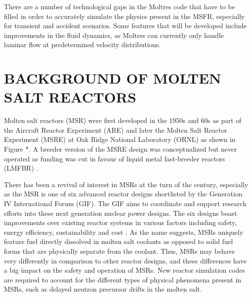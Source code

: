 \documentclass[letterpaper]{mandc2019}
\begin{document}
There are a number of technological gaps in the Moltres code that have to be filled in order to accurately simulate the physics present in the MSFR, especially for transient and accident scenarios. Some features that will be developed include improvements in the fluid dynamics, as Moltres can currently only handle laminar flow at predetermined velocity distributions.

\section{BACKGROUND OF MOLTEN SALT REACTORS}



Molten salt reactors (MSR) were first developed in the 1950s and 60s as part of the Aircraft Reactor Experiment (ARE) and later the Molten Salt Reactor Experiment (MSRE) at Oak Ridge National Laboratory (ORNL) as shown in Figure *. A breeder version of the MSRE design was conceptualized but never operated as funding was cut in favour of liquid metal fast-breeder reactors (LMFBR) \cite{macpherson_molten_1985}.

There has been a revival of interest in MSRs at the turn of the century, especially as the MSR is one of six advanced reactor designs shortlisted by the Generation IV International Forum (GIF). The GIF aims to coordinate and support research efforts into these next generation nuclear power designs. The six designs boast improvements over existing reactor systems in various factors including safety, energy efficiency, sustainability and cost \cite{doe_technology_2002}. As the name suggests, MSRs uniquely feature fuel directly dissolved in molten salt coolants as opposed to solid fuel forms that are physically separate from the coolant. Thus, MSRs may behave very differently in comparison to other reactor designs, and these differences have a big impact on the safety and operation of MSRs. New reactor simulation codes are required to account for the different types of physical phenomena present in MSRs, such as delayed neutron precursor drifts in the molten salt.
\end{document}
